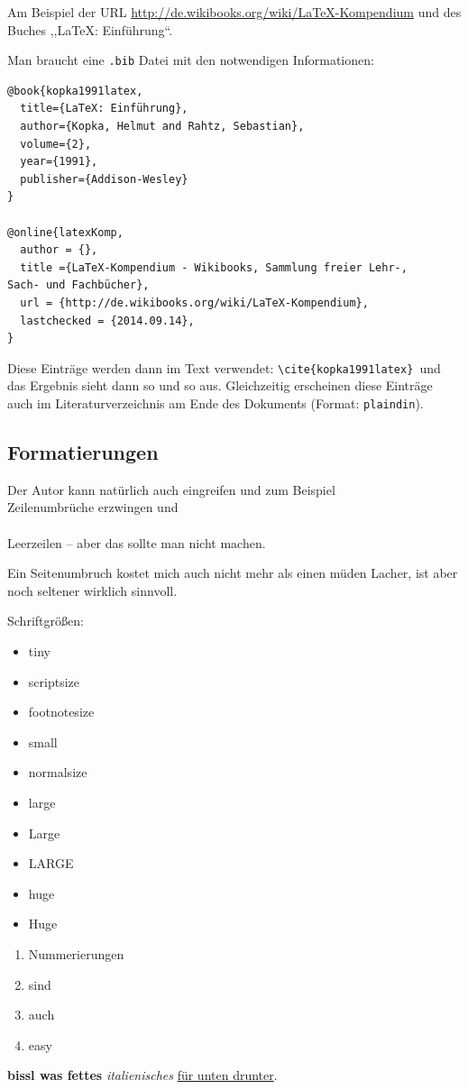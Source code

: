 \documentclass[a4paper,ngerman,naustrian,DIV=12,BCOR=1cm]{scrbook}
\begin{document}
Am Beispiel der URL \url{http://de.wikibooks.org/wiki/LaTeX-Kompendium}
und des Buches ,,\LaTeX{}: Einführung``.

Man braucht eine \texttt{.bib} Datei mit den notwendigen Informationen:

\begin{lstlisting}[language={[LaTeX]TeX},inputencoding={utf8},extendedchars=false]
@book{kopka1991latex,
  title={LaTeX: Einführung},
  author={Kopka, Helmut and Rahtz, Sebastian},
  volume={2},
  year={1991},
  publisher={Addison-Wesley} 
}

@online{latexKomp,
  author = {},
  title ={LaTeX-Kompendium - Wikibooks, Sammlung freier Lehr-, 
Sach- und Fachbücher},
  url = {http://de.wikibooks.org/wiki/LaTeX-Kompendium},
  lastchecked = {2014.09.14},
}
\end{lstlisting}

Diese Einträge werden dann im Text verwendet: \texttt{\textbackslash{}cite\{kopka1991latex\}
}und das Ergebnis sieht dann so \cite{kopka1991latex} und so \cite{latexKomp}
aus. Gleichzeitig erscheinen diese Einträge auch im Literaturverzeichnis
am Ende des Dokuments (Format: \texttt{plaindin}).


\subsection{Formatierungen }

Der Autor kann natürlich auch eingreifen und zum Beispiel\\
Zeilenumbrüche erzwingen und \\
\\
Leerzeilen -- aber das sollte man nicht machen. \newpage{}

Ein Seitenumbruch kostet mich auch nicht mehr als einen müden Lacher,
ist aber noch seltener wirklich sinnvoll.

Schriftgrößen:
\begin{itemize}
\item {\tiny{}tiny} 
\item {\scriptsize{}scriptsize} 
\item {\footnotesize{}footnotesize} 
\item {\small{}small} 
\item normalsize 
\item {\large{}large} 
\item {\Large{}Large} 
\item {\LARGE{}LARGE} 
\item {\huge{}huge} 
\item {\Huge{}Huge} \end{itemize}
\begin{enumerate}
\item Nummerierungen
\item sind 
\item auch 
\item easy
\end{enumerate}
\textbf{bissl was fettes} \textit{italienisches} \uline{für unten
drunter}.
\end{document}
